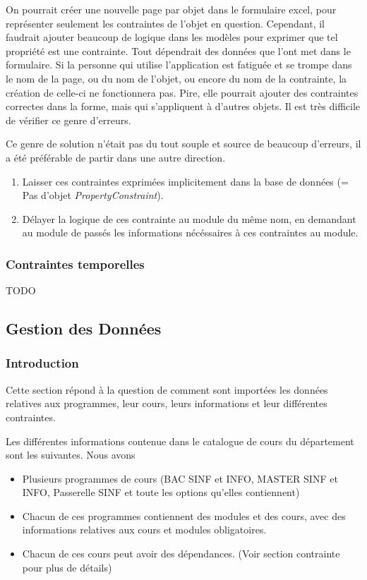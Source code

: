 On pourrait créer une nouvelle page par objet dans le formulaire excel, pour représenter seulement les contraintes de l'objet en question. Cependant, il faudrait ajouter beaucoup de logique dans les modèles pour exprimer que tel propriété est une contrainte. Tout dépendrait des données que l'ont met dans le formulaire. Si la personne qui utilise l'application est fatiguée et se trompe dans le nom de la page, ou du nom de l'objet, ou encore du nom de la contrainte, la création de celle-ci ne fonctionnera pas. Pire, elle pourrait ajouter des contraintes correctes dans la forme, mais qui s'appliquent à d'autres objets. Il est très difficile de vérifier ce genre d'erreurs. 

Ce genre de solution n'était pas du tout souple et source de beaucoup d'erreurs, il a été préférable de partir dans une autre direction. 
\begin{enumerate}
\item Laisser ces contraintes exprimées implicitement dans la base de données (= Pas d'objet \textit{PropertyConstraint}).
\item Délayer la logique de ces contrainte au module du même nom, en demandant au module de passés les informations nécéssaires à ces contraintes au module. 
\end{enumerate} 
\subsubsection{Contraintes temporelles}
TODO
\subsection{Gestion des Données}
\label{gestion_des_données}
\subsubsection{Introduction}
Cette section répond à la question de comment sont importées les données relatives aux programmes, leur cours, leurs informations et leur différentes contraintes. 

Les différentes informations contenue dans le catalogue de cours du département sont les suivantes. Nous avons
\begin{itemize}
\item Plusieurs programmes de cours (BAC SINF et INFO, MASTER SINF et INFO, Passerelle SINF et toute les options qu'elles contiennent)
\item Chacun de ces programmes contiennent des modules et des cours, avec des informations relatives aux cours et modules obligatoires.
\item Chacun de ces cours peut avoir des dépendances. (Voir section contrainte pour plus de détails)
\end{itemize}

